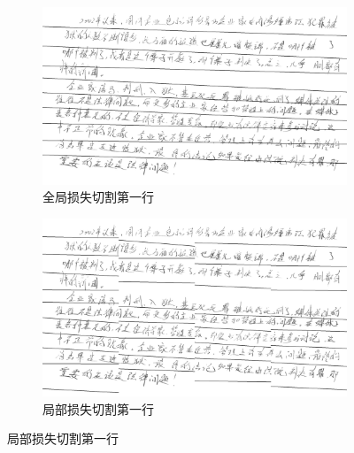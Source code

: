 \begin{figure}[ht!]
	\centering
	\begin{subfigure}{.69\textwidth}
		\centering
		\includegraphics[width=1.0\textwidth]{figure/line1.png}
		\caption{全局损失切割第一行}
		\label{fig:line1}
	\end{subfigure}
	\begin{subfigure}{.3\textwidth}
		\centering
		\includegraphics[width=1.0\textwidth]{figure/line2.png}
		\caption{局部损失切割第一行}
		\label{fig:line2}
	\end{subfigure}
	

\end{figure}
